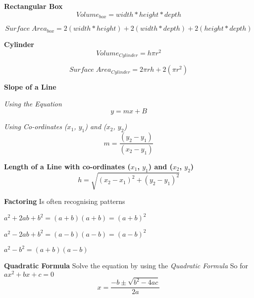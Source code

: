 \documentclass{article}
\begin{document}
\textbf{Rectangular Box}
\begin{equation}
Volume_{box} = width * height * depth
\end{equation}

\begin{equation}
Surface\;Area_{box} = 2(width * height) + 2(width * depth) + 2(height * depth)
\end{equation}

\textbf{Cylinder}
\begin{equation}
Volume_{ Cylinder} = h \pi r^ 2
\end{equation}

\begin{equation}
Surface\;Area_{ Cylinder} = 2 \pi r h + 2(\pi r^ 2 )
\end{equation}

\textbf{Slope of a Line}

\textit{Using the Equation}
\begin{equation}
y = mx + B
\end{equation}

\textit{Using Co-ordinates ($x_1$, $y_1$) and ($x_2$, $y_2$) }
\begin{equation}
m = \frac{ (y_2 - y_1) }{ (x_2 - y_1) }
\end{equation}

\textbf{Length of a Line with co-ordinates  ($x_1$, $y_1$) and ($x_2$, $y_2$) }
\begin{equation}
h= \sqrt{(x_{2}-x_{1})^2 + (y_{2}-y_{1})^2}
\end{equation}


\textbf{Factoring}
Is often recognising patterns

$a^{2} + 2ab + b^{2} = (a + b) (a + b)  = (a + b)^{2}$

$a^{2} - 2ab + b^{2} = (a - b) (a - b)  = (a - b)^{2}$

$a^{2} - b^{2} = (a + b) (a - b)$


\textbf{Quadratic Formula}
Solve the equation by using the \textit{Quadratic Formula}  
So for $ax^{2} + bx + c = 0$
\begin{equation}
x = \frac{-b \pm \sqrt{b^{2}-4ac}}{2a}
\end{equation}
\end{document}
